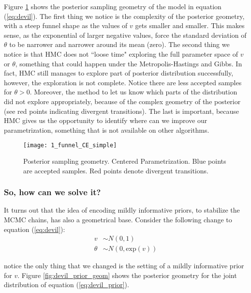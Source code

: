 Figure \ref{fig:devil_CE_geom} shows the posterior sampling geometry of the model in equation (\ref{eq:devil}). The first thing we notice is the complexity of the posterior geometry, with a steep funnel shape as the values of $v$ gets smaller and smaller. This makes sense, as the exponential of larger negative values, force the standard deviation of $\theta$ to be narrower and narrower around its mean (zero). The second thing we notice is that HMC does not ``loose time" exploring the full parameter space of $v$ or $\theta$, something that could happen under the Metropolis-Hastings and Gibbs. In fact, HMC still manages to explore part of posterior distribution successfully, however, the exploration is not complete. Notice there are less accepted samples for $\theta>0$. Moreover, the method to let us know which parts of the distribution did not explore appropriately, because of the complex geometry of the posterior (see red points indicating divergent transitions). The last is important, because HMC gives us the opportunity to identify where can we improve our parametrization, something that is not available on other algorithms.
%
\begin{figure}[h]
	\centering
	\texttt{[image: 1\_funnel\_CE\_simple]}
	\caption[Posterior sampling geometry. Centered Parametrization.]%
	{Posterior sampling geometry. Centered Parametrization. Blue points are accepted samples. Red points denote divergent transitions.}
	\label{fig:devil_CE_geom}
\end{figure}


\subsubsection{So, how can we solve it?}

It turns out that the idea of encoding mildly informative priors, to stabilize the MCMC chains, has also a geometrical base. Consider the following change to equation (\ref{eq:devil}):
%
\begin{equation} \label{eq:devil_prior}
	\begin{split}	
		v &\sim N(0, 1) \\
		\theta &\sim N(0, \text{exp}(v))
	\end{split}
\end{equation}

\noindent notice the only thing that we changed is the setting of a mildly informative prior for $v$. Figure \ref{fig:devil_prior_geom} shows the posterior geometry for the joint distribution of equation (\ref{eq:devil_prior}). 

